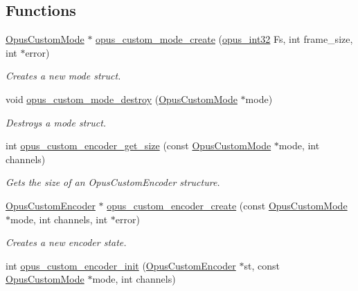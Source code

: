 \subsection*{Functions}
\begin{DoxyCompactItemize}
\item 
\hyperlink{group__opus__custom_gaf33847c711195b9edef896b73c96ec4f}{OpusCustomMode} $\ast$ \hyperlink{group__opus__custom_ga8d6683d0b9f2990a8f54d8bafe4f4027}{opus\_\-custom\_\-mode\_\-create} (\hyperlink{opus__types_8h_aa4d309d6f80b99dbabebc8f98879ab9a}{opus\_\-int32} Fs, int frame\_\-size, int $\ast$error)
\begin{DoxyCompactList}\small\item\em Creates a new mode struct. \item\end{DoxyCompactList}\item 
void \hyperlink{group__opus__custom_ga1333ad19db2acd8edf558ac6365741de}{opus\_\-custom\_\-mode\_\-destroy} (\hyperlink{group__opus__custom_gaf33847c711195b9edef896b73c96ec4f}{OpusCustomMode} $\ast$mode)
\begin{DoxyCompactList}\small\item\em Destroys a mode struct. \item\end{DoxyCompactList}\item 
int \hyperlink{group__opus__custom_ga42f50e7f2942144c18c321f00f358ba0}{opus\_\-custom\_\-encoder\_\-get\_\-size} (const \hyperlink{group__opus__custom_gaf33847c711195b9edef896b73c96ec4f}{OpusCustomMode} $\ast$mode, int channels)
\begin{DoxyCompactList}\small\item\em Gets the size of an OpusCustomEncoder structure. \item\end{DoxyCompactList}\item 
\hyperlink{group__opus__custom_ga7abe6a7afc599667950251c987feb439}{OpusCustomEncoder} $\ast$ \hyperlink{group__opus__custom_ga5aa778f7b0d93b397c1c0fb04b59eb02}{opus\_\-custom\_\-encoder\_\-create} (const \hyperlink{group__opus__custom_gaf33847c711195b9edef896b73c96ec4f}{OpusCustomMode} $\ast$mode, int channels, int $\ast$error)
\begin{DoxyCompactList}\small\item\em Creates a new encoder state. \item\end{DoxyCompactList}\item 
int \hyperlink{group__opus__custom_gacd63f7f4f4b198d941d46ceb9fccfea2}{opus\_\-custom\_\-encoder\_\-init} (\hyperlink{group__opus__custom_ga7abe6a7afc599667950251c987feb439}{OpusCustomEncoder} $\ast$st, const \hyperlink{group__opus__custom_gaf33847c711195b9edef896b73c96ec4f}{OpusCustomMode} $\ast$mode, int channels)

\end{DoxyCompactItemize}
